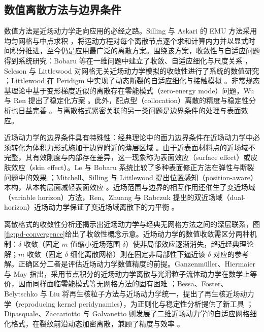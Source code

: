 \subsection{数值离散方法与边界条件}

数值方法是近场动力学走向应用的必经之路。Silling 与 Askari 的 EMU 方法采用均匀网格与中点求积 \cite{SillingAskari2005}，将运动方程对每个离散节点逐个求和计算内力并以显式时间积分推进，至今仍是应用最广泛的离散方案。围绕该方案，收敛性与自适应问题得到系统研究：Bobaru 等在一维问题中建立了收敛、自适应细化与尺度关系 \cite{Bobaru2009}，Seleson 与 Littlewood 对网格无关近场动力学模拟的收敛性进行了系统的数值研究 \cite{SelesonLittlewood2016}；Littlewood 在 Peridigm 中实现了动态断裂的自适应细化与接触模拟 \cite{Littlewood2010}。非常规态基理论中基于变形梯度近似的离散存在零能模式（zero-energy mode）问题，Wu 与 Ren 提出了稳定化方案 \cite{WuRen2015}。此外，配点型（collocation）离散的精度与稳定性分析也日益完善 \cite{SelesonLittlewood2016}。与离散格式紧密关联的另一类问题是边界条件的处理与表面效应。

近场动力学的边界条件具有特殊性：经典理论中的面力边界条件在近场动力学中必须转化为体积力形式施加于边界附近的薄层区域 \cite{SillingLehoucq2010}。由于近表面材料点的近场域不完整，其有效刚度与内部存在差异，这一现象称为表面效应（surface effect）或皮肤效应（skin effect）。Le 与 Bobaru 系统比较了多种表面修正方法在弹性与断裂问题中的效果 \cite{LeBobaru2018}；Mitchell、Silling 与 Littlewood 提出位置感知（position-aware）本构，从本构层面减轻表面效应 \cite{Mitchell2015}。近场范围与边界的相互作用还催生了变近场域（variable horizon）方法，Ren、Zhuang 与 Rabczuk 提出的双近场域（dual-horizon）近场动力学保证了变近场域离散下的力平衡 \cite{Ren2017dualhorizon}。

离散格式的收敛性分析还揭示出近场动力学与经典无网格方法之间的深层联系，图\ref{fig:pd-convergence}给出了收敛性概念示意。近场动力学的数值收敛需区分两种机制：$\delta$ 收敛（固定 $m$ 值缩小近场范围 $\delta$）使非局部效应逐渐消失，趋近经典理论解；$m$ 收敛（固定 $\delta$ 细化离散网格）则在固定非局部性下逼近该 $\delta$ 对应的参考解。正确区分二者是评估近场动力学数值精度的前提。Ganzenm\"uller、Hiermaier 与 May 指出，采用节点积分的近场动力学离散与光滑粒子流体动力学在数学上等价，因而同样面临零能模式等无网格方法的固有困难 \cite{Ganzenmuller2015}；Bessa、Foster、Belytschko 与 Liu 将再生核粒子方法与近场动力学统一，提出了再生核近场动力学（reproducing kernel peridynamics），为正则化与稳定性分析提供了新工具 \cite{Bessa2014}；Dipasquale、Zaccariotto 与 Galvanetto 则发展了二维近场动力学的自适应网格细化格式，在裂纹前沿动态加密离散，兼顾了精度与效率 \cite{Dipasquale2014}。

